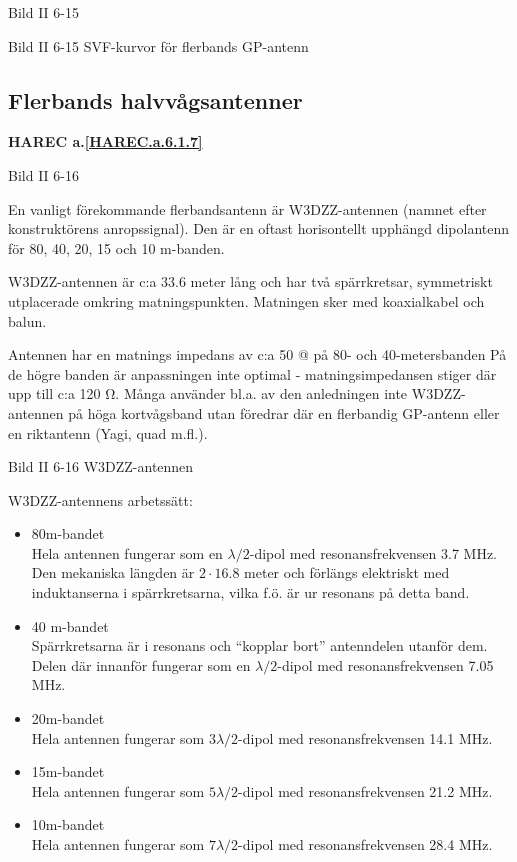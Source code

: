 Bild II 6-15

Bild II 6-15 SVF-kurvor för flerbands GP-antenn

\subsection{Flerbands halvvågsantenner}
\textbf{
HAREC a.\ref{HAREC.a.6.1.7}\label{myHAREC.a.6.1.7}
}

Bild II 6-16

En vanligt förekommande flerbandsantenn är W3DZZ-antennen (namnet
efter konstruktörens anropssignal). Den är en oftast horisontellt
upphängd dipolantenn för 80, 40, 20, 15 och 10 m-banden.

W3DZZ-antennen är c:a 33.6 meter lång och har två spärrkretsar,
symmetriskt utplacerade omkring matningspunkten. Matningen sker med
koaxialkabel och balun.

Antennen har en matnings impedans av c:a 50 @ på 80- och
40-metersbanden På de högre banden är anpassningen inte optimal -
matningsimpedansen stiger där upp till c:a 120 Ω. Många använder
bl.a. av den anledningen inte W3DZZ-antennen på höga kortvågsband utan
föredrar där en flerbandig GP-antenn eller en riktantenn (Yagi, quad
m.fl.).

Bild II 6-16 W3DZZ-antennen

W3DZZ-antennens arbetssätt:
\begin{itemize}
  \item 80m-bandet \\ Hela antennen fungerar som en
    \(\lambda/2\)-dipol med resonansfrekvensen 3.7 MHz.  Den mekaniska
    längden är \(2 \cdot 16.8\) meter och förlängs elektriskt med
    induktanserna i spärrkretsarna, vilka f.ö. är ur resonans på detta
    band.
  \item 40 m-bandet \\ Spärrkretsarna är i resonans och ``kopplar
    bort'' antenndelen utanför dem. Delen där innanför fungerar som en
    \(\lambda/2\)-dipol med resonansfrekvensen 7.05 MHz.

  \item 20m-bandet \\ Hela antennen fungerar som \(3\lambda/2\)-dipol
    med resonansfrekvensen 14.1 MHz.

  \item 15m-bandet \\ Hela antennen fungerar som \(5\lambda/2\)-dipol
    med resonansfrekvensen 21.2 MHz.

  \item 10m-bandet \\ Hela antennen fungerar som \(7\lambda/2\)-dipol
    med resonansfrekvensen 28.4 MHz.
\end{itemize}
